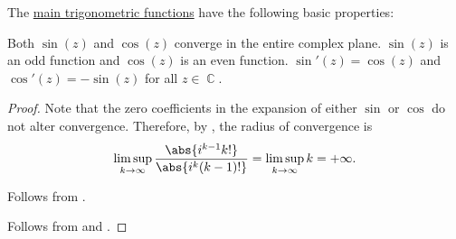 \begin{proposition}\label{thm:def:trigonometric_function}
  The \hyperref[def:trigonometric_functions]{main trigonometric functions} have the following basic properties:
  \begin{thmenum}
     Both \( \sin(z) \) and \( \cos(z) \) converge in the entire complex plane.
     \( \sin(z) \) is an odd function and \( \cos(z) \) is an even function.
     \( \sin'(z) = \cos(z) \) and \( \cos'(z) = -\sin(z) \) for all \( z \in \BbbC \).
  \end{thmenum}
\end{proposition}
\begin{proof}
   Note that the zero coefficients in the expansion of either \( \sin \) or \( \cos \) do not alter convergence. Therefore, by , the radius of convergence is
  \begin{equation*}
    \limsup_{k \to \infty} \frac {\abs{i^{k-1} k!}} {\abs{i^k (k-1)!}}
    =
    \limsup_{k \to \infty} k
    =
    +\infty.
  \end{equation*}

   Follows from .

   Follows from  and .
\end{proof}

